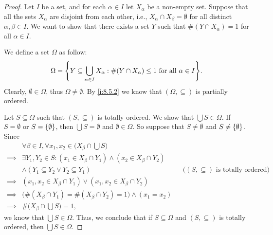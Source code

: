 \begin{proof}
  Let \(I\) be a set, and for each \(\alpha \in I\) let \(X_{\alpha}\) be a non-empty set.
  Suppose that all the sets \(X_{\alpha}\) are disjoint from each other, i.e., \(X_{\alpha} \cap X_{\beta} = \emptyset\) for all distinct \(\alpha, \beta \in I\).
  We want to show that there exists a set \(Y\) such that \(\#(Y \cap X_{\alpha}) = 1\) for all \(\alpha \in I\).

  We define a set \(\Omega\) as follow:
  \[
    \Omega = \set{Y \subseteq \bigcup_{\alpha \in I} X_{\alpha} : \#(Y \cap X_{\alpha}) \leq 1 \text{ for all } \alpha \in I}.
  \]
  Clearly, \(\emptyset \in \Omega\), thus \(\Omega \neq \emptyset\).
  By \cref{i:8.5.2} we know that \((\Omega, \subseteq)\) is partially ordered.

  Let \(S \subseteq \Omega\) such that \((S, \subseteq)\) is totally ordered.
  We show that \(\bigcup S \in \Omega\).
  If \(S = \emptyset\) or \(S = \left\lbrace\emptyset\right\rbrace\), then \(\bigcup S = \emptyset\) and \(\emptyset \in \Omega\).
  So suppose that \(S \neq \emptyset\) and \(S \neq \left\lbrace\emptyset\right\rbrace\).
  Since
  \begin{align*}
             & \forall \beta \in I, \forall x_1, x_2 \in \Big(X_{\beta} \cap \bigcup S\Big)                                                                 \\
    \implies & \exists Y_1, Y_2 \in S : (x_1 \in X_{\beta} \cap Y_1) \land (x_2 \in X_{\beta} \cap Y_2)                                                     \\
             & \land (Y_1 \subseteq Y_2 \lor Y_2 \subseteq Y_1)                                         &  & \text{(\((S, \subseteq)\) is totally ordered)} \\
    \implies & (x_1, x_2 \in X_{\beta} \cap Y_1) \lor (x_1, x_2 \in X_{\beta} \cap Y_2)                                                                     \\
    \implies & \big(\#(X_{\beta} \cap Y_1) = \#(X_{\beta} \cap Y_2) = 1\big) \land (x_1 = x_2)                                                              \\
    \implies & \#\Big(X_{\beta} \cap \bigcup S\Big) = 1,
  \end{align*}
  we know that \(\bigcup S \in \Omega\).
  Thus, we conclude that if \(S \subseteq \Omega\) and \((S, \subseteq)\) is totally ordered, then \(\bigcup S \in \Omega\).


\end{proof}
